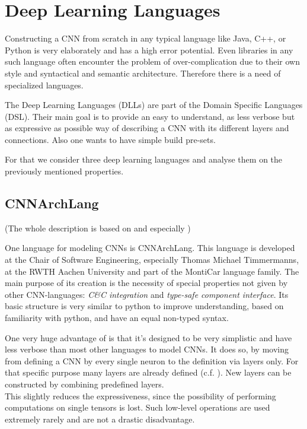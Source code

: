 \chapter{Deep Learning Languages}\label{chapter: DLL}

Constructing a CNN from scratch in any typical language like Java, C++, or Python is very elaborately and has a high error potential. Even libraries in any such language often encounter the problem of over-complication due to their own style and syntactical and semantic architecture. Therefore there is a need of specialized languages.

The Deep Learning Languages (DLLs) are part of the Domain Specific Languages (DSL). Their main goal is to provide an easy to understand, as less verbose but as expressive as possible way of describing a CNN with its different layers and connections. Also one wants to have simple build pre-sets.

For that we consider three deep learning languages and analyse them on the previously mentioned properties.

\section{CNNArchLang}\label{sec: CNNArch}

(The whole description is based on\cite{CNNArch} and especially \cite{tim2018CNNArchLang})

One language for modeling CNNs is CNNArchLang. This language is developed at the Chair of Software Engineering, especially Thomas Michael Timmermanns,  at the RWTH Aachen University and part of the MontiCar language family. The main purpose of its creation is the necessity of special properties not given by other CNN-languages: \textit{C\&C integration} and \textit{type-safe component interface}. Its basic structure is very similar to python to improve understanding, based on familiarity with python, and have an equal non-typed syntax. 

One very huge advantage of \cnnarch is that it's designed to be very simplistic and have less verbose than most other languages to model CNNs. It does so, by moving from defining a CNN by every single neuron to the definition via layers only. For that specific purpose many layers are already defined (c.f. ). 
New layers can be constructed by combining predefined layers.\\
This slightly reduces the expressiveness, since the possibility of performing computations on single tensors is lost. Such low-level operations are used extremely rarely and are not a drastic disadvantage.

